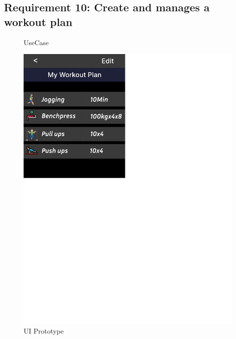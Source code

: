 \documentclass{article}
\begin{document}
	\subsection{Requirement 10: Create and manages a workout plan}
		\begin{figure}[h!]
			\centering
			\captionsetup{labelformat=empty}
			\caption{UseCase}
		\end{figure}
		\clearpage
		\begin{figure}[h!]
			\centering
			\captionsetup{labelformat=empty}
		    	\includegraphics[scale=1.6, angle=0]{Marc/UIPrototype/workout.pdf}
			\caption{UI Prototype}
		\end{figure}
		\clearpage
\end{document}
